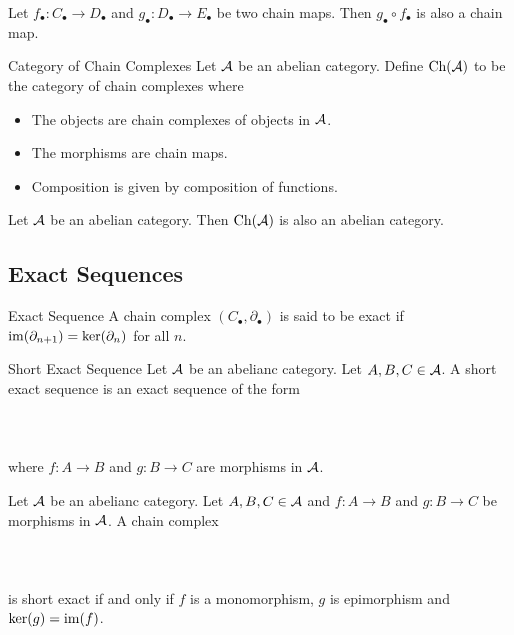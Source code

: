 \documentclass[a4paper]{article}
\begin{document}
\begin{prp}{}{} Let $f_\bullet:C_\bullet\to D_\bullet$ and $g_\bullet:D_\bullet\to E_\bullet$ be two chain maps. Then $g_\bullet\circ f_\bullet$ is also a chain map. \tcbline
\end{prp}

\begin{defn}{Category of Chain Complexes}{} Let $\mathcal{A}$ be an abelian category. Define $\text{Ch}(\mathcal{A})$ to be the category of chain complexes where 
\begin{itemize}
\item The objects are chain complexes of objects in $\mathcal{A}$. 
\item The morphisms are chain maps. 
\item Composition is given by composition of functions. 
\end{itemize}
\end{defn}

\begin{thm}{}{} Let $\mathcal{A}$ be an abelian category. Then $\text{Ch}(\mathcal{A})$ is also an abelian category. 
\end{thm}

\subsection{Exact Sequences}
\begin{defn}{Exact Sequence}{} A chain complex $(C_\bullet,\partial_\bullet)$ is said to be exact if $\operatorname{im}(\partial_{n+1})=\ker(\partial_n)$ for all $n$. 
\end{defn}

\begin{defn}{Short Exact Sequence}{} Let $\mathcal{A}$ be an abelianc category. Let $A,B,C\in\mathcal{A}$. A short exact sequence is an exact sequence of the form \\~\\
\\~\\
where $f:A\to B$ and $g:B\to C$ are morphisms in $\mathcal{A}$. 
\end{defn}

\begin{prp}{}{} Let $\mathcal{A}$ be an abelianc category. Let $A,B,C\in\mathcal{A}$ and $f:A\to B$ and $g:B\to C$ be morphisms in $\mathcal{A}$. A chain complex \\~\\
\\~\\
is short exact if and only if $f$ is a monomorphism, $g$ is epimorphism and $\ker(g)=\operatorname{im}(f)$. 
\end{prp}
\end{document}
